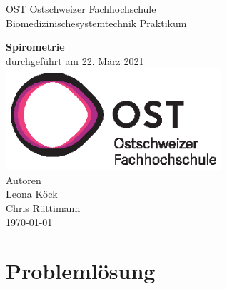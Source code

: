 \documentclass[11pt]{scrartcl}
\begin{document}
    \begin{titlepage}
        \begin{center}
        {\LARGE OST Ostschweizer Fachhochschule}
            \\[1.5cm]
            \linespread{1.2}\large { Biomedizinischesystemtechnik Praktikum }

            \huge{\bfseries Spirometrie}
            \\%
            \large{durchgef{\"u}hrt am 22. März 2021}
            \\[1.5cm]
           \includegraphics[width=8cm]{../images/ost_logo.eps}
           \\[1cm]
            {\small{Autoren}}\\
            {\Large{Leona K{\"o}ck}}\\
            {\Large{Chris R{\"u}ttimann}}
            \\[1cm]

            \vspace*{\fill}
            \large{\today}
        \end{center}

    \end{titlepage}

    \addtocounter{section}{0}

    \tableofcontents
    \pagebreak



    \section{Problemlösung}
\end{document}
